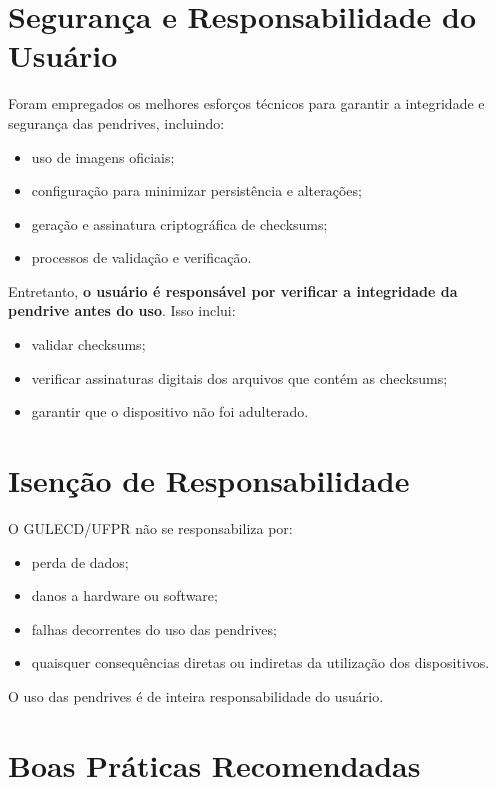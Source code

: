\documentclass[12pt,a4paper]{article}
\begin{document}
\section{Segurança e Responsabilidade do Usuário}

Foram empregados os melhores esforços técnicos para garantir a integridade e segurança das pendrives, incluindo:

\begin{itemize}
    \item uso de imagens oficiais;
    \item configuração para minimizar persistência e alterações;
    \item geração e assinatura criptográfica de checksums;
    \item processos de validação e verificação.
\end{itemize}

Entretanto, \textbf{o usuário é responsável por verificar a integridade da pendrive antes do uso}. Isso inclui:

\begin{itemize}
    \item validar checksums;
    \item verificar assinaturas digitais dos arquivos que contém as checksums;
    \item garantir que o dispositivo não foi adulterado.
\end{itemize}

\section{Isenção de Responsabilidade}

O GULECD/UFPR não se responsabiliza por:

\begin{itemize}
    \item perda de dados;
    \item danos a hardware ou software;
    \item falhas decorrentes do uso das pendrives;
    \item quaisquer consequências diretas ou indiretas da utilização dos dispositivos.
\end{itemize}

O uso das pendrives é de inteira responsabilidade do usuário.

\section{Boas Práticas Recomendadas}
\end{document}
